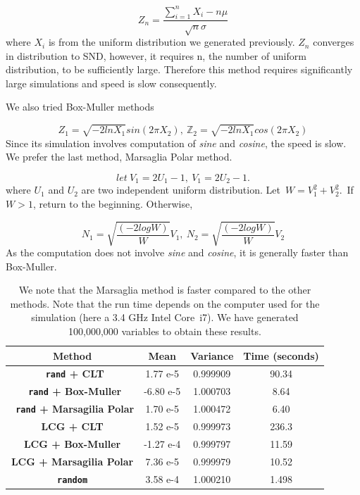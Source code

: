\documentclass[11pt,a4paper,fleqn,draft]{article}
\newcommand\Z{\mathbb Z}
\begin{document}
$$ Z_n = \frac{\sum_{i=1}^{n}X_i-n\mu}{\sqrt{n}\sigma}$$where $X_i$ is from the uniform distribution we generated previously. $Z_n$ converges in distribution to SND, however, it requires n, the number of uniform distribution, to be sufficiently large. Therefore this method requires significantly large simulations and speed is slow consequently.

We also tried Box-Muller methods  \cite{lectures}

$$Z_1 = \sqrt{-2lnX_1}sin(2\pi X_2),\  \Z_2=\sqrt{-2lnX_1}cos(2\pi X_2)$$Since its simulation involves computation of \textit{sine} and \textit{cosine}, the speed is slow.
We prefer the last method, Marsaglia Polar method.

$$ let \ V_1 = 2U_1-1,\  V_1 = 2U_2-1.$$
where $U_1$ and $U_2$ are two independent uniform distribution.
 Let\ $W = V_1^2+V_2^2.$\ If $W>1$, return to the beginning. Otherwise,

$$N_1 = \sqrt{\frac{(-2logW)}{W}}V_1,\ N_2 = \sqrt{\frac{(-2logW)}{W}}V_2$$As the computation does not involve \textit{sine} and \textit{cosine}, it is generally faster than Box-Muller.



\begin{table} [h!]
\centering
\begin{tabular}{| c| c| c| c| }
\hline
\textbf{ Method} &\textbf{ Mean} & \textbf{Variance}&\textbf{ Time (seconds)} \\ \hline
\textbf{\texttt{ rand}  + CLT} & 1.77 e-5 & 0.999909 & 90.34 \\  \hline
\textbf{\texttt{ rand}  + Box-Muller} & -6.80 e-5 & 1.000703&8.64\\ \hline
\textbf{\texttt{ rand}  + Marsagilia Polar} & 1.70 e-5& 1.000472& 6.40\\ \hline
\textbf{ LCG + CLT} & 1.52 e-5& 0.999973&236.3\\ \hline
\textbf{LCG + Box-Muller} & -1.27 e-4 & 0.999797&11.59\\ \hline
\textbf{ LCG + Marsagilia Polar} & 7.36 e-5 & 0.999979&10.52\\ \hline
\textbf{\texttt{random} }& 3.58 e-4 & 1.000210&1.498\\ \hline
\end{tabular}
\caption{We note that the Marsaglia method is faster compared to the other methods. Note that the run time depends on the computer used for the simulation (here a 3.4 GHz Intel Core~i7). We have generated 100,000,000 variables to obtain these results.}
\end{table}
\end{document}
